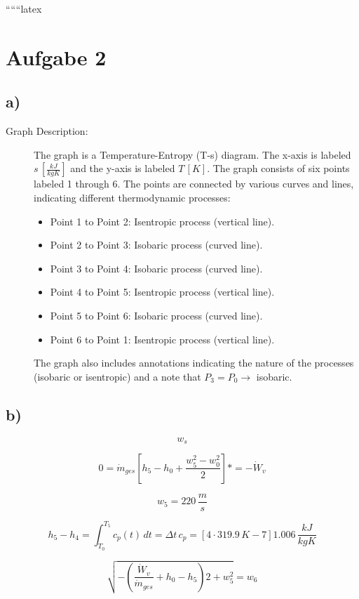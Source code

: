 
``````latex


\section*{Aufgabe 2}

\subsection*{a)}

\begin{description}
    \item[Graph Description:] The graph is a Temperature-Entropy (T-s) diagram. The x-axis is labeled $s \, [\frac{kJ}{kgK}]$ and the y-axis is labeled $T \, [K]$. The graph consists of six points labeled 1 through 6. The points are connected by various curves and lines, indicating different thermodynamic processes:
    \begin{itemize}
        \item Point 1 to Point 2: Isentropic process (vertical line).
        \item Point 2 to Point 3: Isobaric process (curved line).
        \item Point 3 to Point 4: Isobaric process (curved line).
        \item Point 4 to Point 5: Isentropic process (vertical line).
        \item Point 5 to Point 6: Isobaric process (curved line).
        \item Point 6 to Point 1: Isentropic process (vertical line).
    \end{itemize}
    The graph also includes annotations indicating the nature of the processes (isobaric or isentropic) and a note that $P_3 = P_0 \rightarrow$ isobaric.
\end{description}

\subsection*{b)}

\[
w_s
\]

\[
0 = \dot{m}_{ges} \left[ h_5 - h_0 + \frac{w_5^2 - w_0^2}{2} \right] * = -\dot{W}_v
\]

\[
w_5 = 220 \, \frac{m}{s}
\]

\[
h_5 - h_4 = \int_{T_0}^{T_5} c_p(t) \, dt = \Delta t \, c_p = \left[ 4 \cdot 319.9 \, K - 7 \right] 1.006 \, \frac{kJ}{kgK}
\]

\[
\sqrt{-\left( \frac{\dot{W}_v}{\dot{m}_{ges}} + h_0 - h_5 \right) 2 + w_5^2} = w_6
\]

